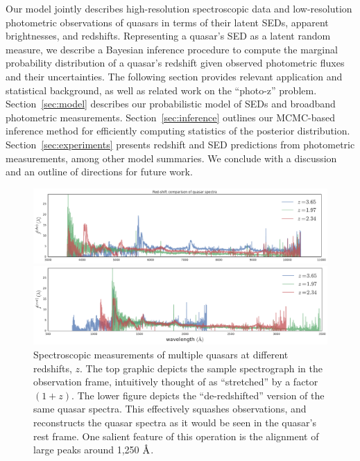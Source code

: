 \documentclass{article}
\newcommand{\angstrom}{\textup{\AA}}
\begin{document}
Our model jointly describes high-resolution spectroscopic data and low-resolution photometric observations of quasars in terms of their latent SEDs, apparent brightnesses, and redshifts. 
Representing a quasar's SED as a latent random measure, we describe a Bayesian inference procedure to compute the marginal probability distribution of a quasar's redshift given observed photometric fluxes and their uncertainties.  
The following section provides relevant application and statistical background, as well as related work on the ``photo-z'' problem.
Section~\ref{sec:model} describes our probabilistic model of SEDs and broadband photometric measurements.
Section~\ref{sec:inference} outlines our MCMC-based inference method for efficiently computing statistics of the posterior distribution.
Section~\ref{sec:experiments} presents redshift and SED predictions from photometric measurements, among other model summaries.
We conclude with a discussion and an outline of directions for future work.  

\begin{figure}[ht]
\vskip 0in
\begin{center}
\centerline{\includegraphics[width=1.9\columnwidth]{../figs/quasar_redshift_obs_frame}}
\centerline{\includegraphics[width=1.9\columnwidth]{../figs/quasar_redshift_rest_frame}}
\vskip -0.18in
\caption{%
Spectroscopic measurements of multiple quasars at different redshifts, $z$.
The top graphic depicts the sample spectrograph in the observation frame, intuitively thought of as ``stretched'' by a factor $(1+z)$.
The lower figure depicts the ``de-redshifted'' version of the same quasar spectra.
This effectively squashes observations, and reconstructs the quasar spectra as it would be seen in the quasar's rest frame.
One salient feature of this operation is the alignment of large peaks around 1,250 $\angstrom$. }
\label{fig:frames}
\end{center}
\vskip -0.28in
\end{figure} 
\end{document}

